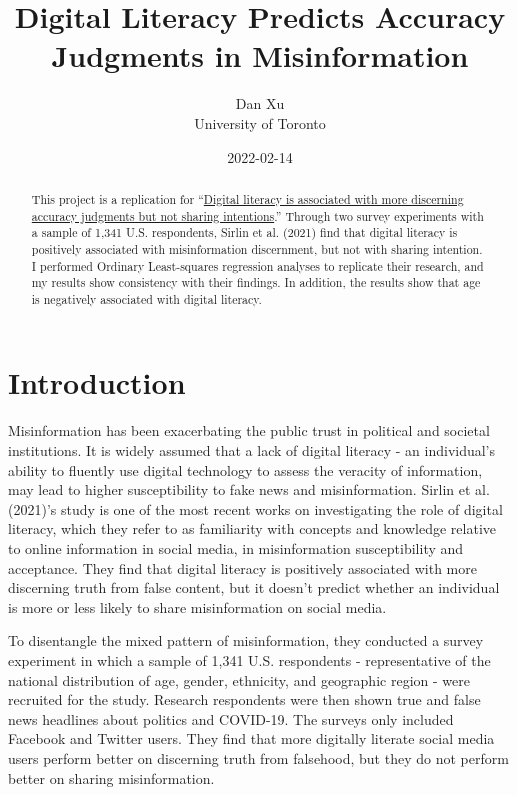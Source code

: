 \documentclass[
]{article}
\title{Digital Literacy Predicts Accuracy Judgments in Misinformation}
\author{Dan Xu\\
University of Toronto}
\date{2022-02-14}
\begin{document}
\maketitle
\begin{abstract}
This project is a replication for ``\href{https://misinforeview.hks.harvard.edu/article/digital-literacy-is-associated-with-more-discerning-accuracy-judgments-but-not-sharing-intentions/}{Digital literacy is associated with more discerning accuracy judgments but not sharing intentions}.'' Through two survey experiments with a sample of 1,341 U.S. respondents, Sirlin et al. (2021) find that digital literacy is positively associated with misinformation discernment, but not with sharing intention. I performed Ordinary Least-squares regression analyses to replicate their research, and my results show consistency with their findings. In addition, the results show that age is negatively associated with digital literacy.
\end{abstract}

\hypertarget{introduction}{%
\section{Introduction}\label{introduction}}

Misinformation has been exacerbating the public trust in political and societal institutions. It is widely assumed that a lack of digital literacy - an individual's ability to fluently use digital technology to assess the veracity of information, may lead to higher susceptibility to fake news and misinformation. Sirlin et al. (2021)'s study is one of the most recent works on investigating the role of digital literacy, which they refer to as familiarity with concepts and knowledge relative to online information in social media, in misinformation susceptibility and acceptance. They find that digital literacy is positively associated with more discerning truth from false content, but it doesn't predict whether an individual is more or less likely to share misinformation on social media.

To disentangle the mixed pattern of misinformation, they conducted a survey experiment in which a sample of 1,341 U.S. respondents - representative of the national distribution of age, gender, ethnicity, and geographic region - were recruited for the study. Research respondents were then shown true and false news headlines about politics and COVID-19. The surveys only included Facebook and Twitter users. They find that more digitally literate social media users perform better on discerning truth from falsehood, but they do not perform better on sharing misinformation.
\end{document}
